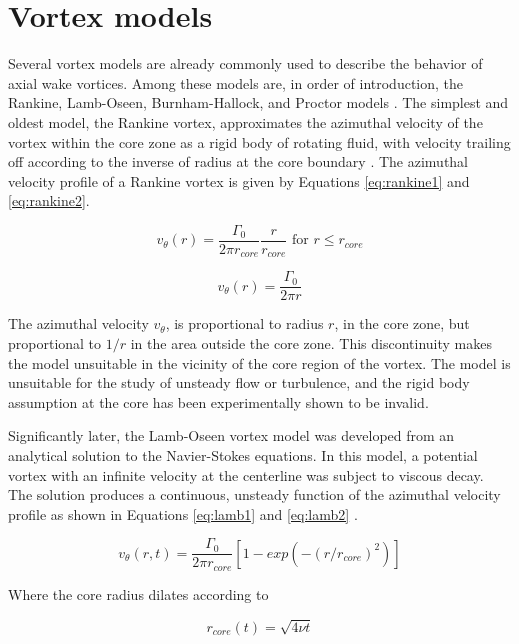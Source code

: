 \section{Vortex models}
Several vortex models are already commonly used to describe the behavior of 
axial wake vortices. Among these models are, in order of introduction, the 
Rankine, Lamb-Oseen, Burnham-Hallock, and Proctor models \cite{ahmad2014}. The 
simplest and oldest model, the Rankine vortex, approximates the azimuthal 
velocity of the vortex within the core zone as a rigid body of rotating fluid, 
with velocity trailing off according to the inverse of radius at the core 
boundary \cite{rankine1869}. The azimuthal velocity profile of a Rankine vortex 
is given by Equations \ref{eq:rankine1} and \ref{eq:rankine2}.

\begin{equation}
v_{\theta}(r) = \frac{\Gamma_0}{2 \pi r_{core}} \frac{r}{r_{core}} 
	\text{ for } r \leq r_{core}
	\label{eq:rankine1}
\end{equation}

\begin{equation}
v_{\theta}(r) = \frac{\Gamma_0}{2 \pi r}
	\label{eq:rankine2}
\end{equation}

\noindent
The azimuthal velocity $v_{\theta}$, is proportional to radius $r$, in the core 
zone, but proportional to $1/r$ in the area outside the core zone. This 
discontinuity makes the model unsuitable in the vicinity of the core region of 
the vortex. The model is unsuitable for the study of unsteady flow or 
turbulence, and the rigid body assumption at the core has been experimentally 
shown to be invalid.

Significantly later, the Lamb-Oseen vortex model was developed from an 
analytical solution to the Navier-Stokes equations. In this model, a potential 
vortex with an infinite velocity at the centerline was subject to viscous 
decay. The solution produces a continuous, unsteady function of the azimuthal 
velocity profile as shown in Equations \ref{eq:lamb1} and \ref{eq:lamb2} 
\cite{lamb1932}.

\begin{equation}
v_{\theta}(r,t) = \frac{\Gamma_0}{2 \pi r_{core}}[1 - 
							exp(-(r / r_{core})^2)]
	\label{eq:lamb1}
\end{equation}

\noindent
Where the core radius dilates according to 

\begin{equation}
r_{core}(t) = \sqrt{4 \nu t}
	\label{eq:lamb2}
\end{equation}

